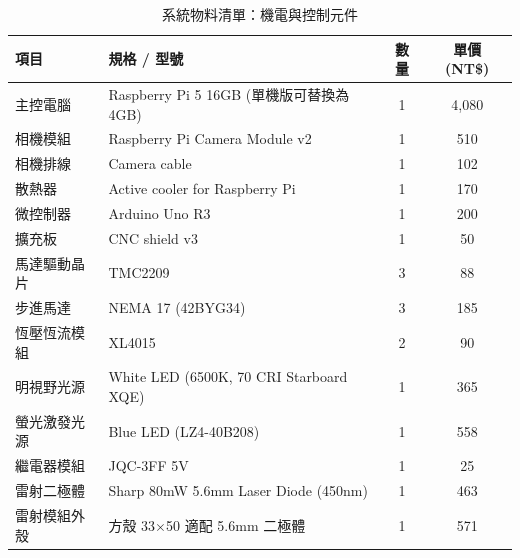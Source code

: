 \begin{table}[H]
    \centering
    \caption{系統物料清單：機電與控制元件}
    \label{tab:bom_electronic}
    \begin{tabular}{llcc}
        \toprule
        項目 & 規格 / 型號 & 數量 & 單價 (NT\$) \\
        \midrule
        主控電腦 & Raspberry Pi 5 16GB (單機版可替換為 4GB) & 1 & 4,080 \\
        相機模組 & Raspberry Pi Camera Module v2 & 1 & 510 \\
        相機排線 & Camera cable & 1 & 102 \\
        散熱器 & Active cooler for Raspberry Pi & 1 & 170 \\
        微控制器 & Arduino Uno R3 & 1 & 200 \\
        擴充板 & CNC shield v3 & 1 & 50 \\
        馬達驅動晶片 & TMC2209 & 3 & 88 \\
        步進馬達 & NEMA 17 (42BYG34) & 3 & 185 \\
        恆壓恆流模組 & XL4015 & 2 & 90 \\
        明視野光源 & White LED (6500K, 70 CRI Starboard XQE) & 1 & 365 \\
        螢光激發光源 & Blue LED (LZ4-40B208) & 1 & 558 \\
        繼電器模組 & JQC-3FF 5V & 1 & 25 \\
        雷射二極體 & Sharp 80mW 5.6mm Laser Diode (450nm) & 1 & 463 \\
        雷射模組外殼 & 方殼 33$\times$50 適配 5.6mm 二極體 & 1 & 571 \\
        \bottomrule
    \end{tabular}
\end{table}